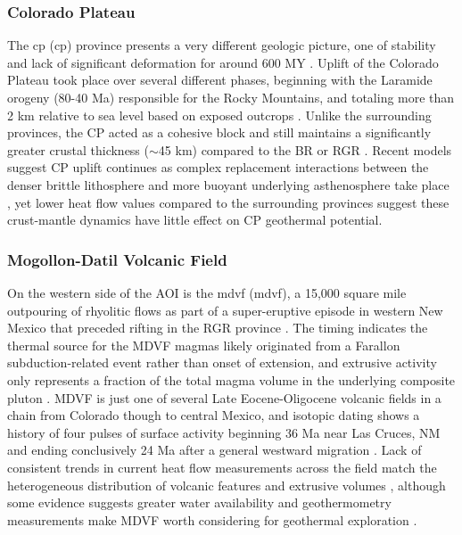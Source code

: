 \subsubsection{Colorado Plateau}

The \acrlong{cp} (\acrshort{cp}) province presents a very different geologic picture, one of stability and lack of significant deformation for around 600 MY \citep{leighty_neogene_1997}. Uplift of the Colorado Plateau took place over several different phases, beginning with the Laramide orogeny (80-40 Ma) responsible for the Rocky Mountains, and totaling more than 2 km relative to sea level based on exposed outcrops \citep{moucha_deep_2009}. Unlike the surrounding provinces, the CP acted as a cohesive block and still maintains a significantly greater crustal thickness ($\sim$45 km) compared to the BR or RGR \citep{wilson_imaging_2005}. Recent models suggest CP uplift continues as complex replacement interactions between the denser brittle lithosphere and more buoyant underlying asthenosphere take place \citep{levander_continuing_2011}, yet lower heat flow values compared to the surrounding provinces \citep{thompson_regional_1979} suggest these crust-mantle dynamics have little effect on CP geothermal potential.

\subsubsection{Mogollon-Datil Volcanic Field}

On the western side of the AOI is the \acrlong{mdvf} (\acrshort{mdvf}), a 15,000 square mile outpouring of rhyolitic flows as part of a super-eruptive episode in western New Mexico that preceded rifting in the RGR province \citep{keller_rio_1999}. The timing indicates the thermal source for the MDVF magmas likely originated from a Farallon subduction-related event rather than onset of extension, and extrusive activity only represents a fraction of the total magma volume in the underlying composite pluton \citep{olsen_rio_1987,schneider_crustal_1994}. MDVF is just one of several Late Eocene-Oligocene volcanic fields in a chain from Colorado though to central Mexico, and isotopic dating shows a history of four pulses of surface activity beginning 36 Ma near Las Cruces, NM and ending conclusively 24 Ma after a general westward migration \citep{mcintosh_time-stratigraphic_1992}. Lack of consistent trends in current heat flow measurements across the field match the heterogeneous distribution of volcanic features and extrusive volumes \citep{mcintosh_time-stratigraphic_1992}, although some evidence suggests greater water availability and geothermometry measurements make MDVF worth considering for geothermal exploration \citep{pepin_new_2018}.

